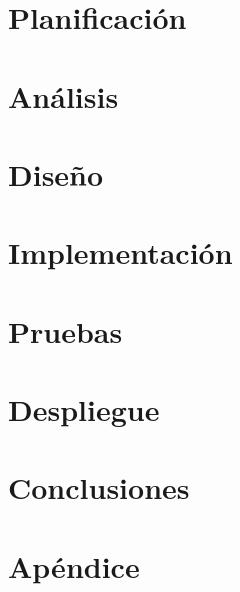 \documentclass[a4paper, 11pt, oneside]{memoir}
\begin{document}
\chapter{Planificación} \label{ch:planificacion}

\cleardoublepage

\chapter{Análisis} \label{ch:analisis}

\cleardoublepage

\chapter{Diseño} \label{ch:diseño}

\cleardoublepage

\chapter{Implementación} \label{ch:implementacion}

\cleardoublepage

\chapter{Pruebas} \label{ch:pruebas}

\cleardoublepage

\chapter{Despliegue} \label{ch:despliegue}

\cleardoublepage

\chapter{Conclusiones} \label{ch:conclusiones}

\cleardoublepage


\backmatter
\appendix

\chapter{Apéndice} \label{ch:apendice}





\end{document}

